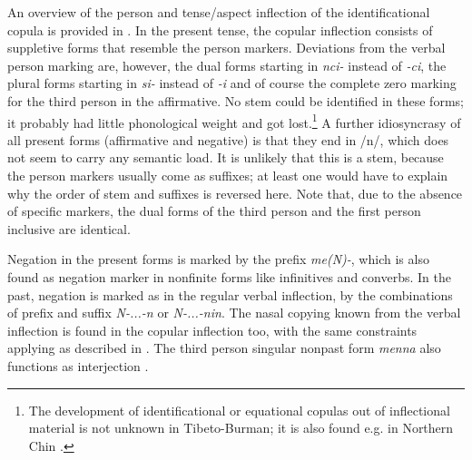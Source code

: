 An overview of the person and tense/aspect inflection of the identificational copula is provided in . In the present tense, the copular inflection consists of suppletive forms that resemble the person markers. Deviations from  the verbal person marking are, however, the dual forms starting in \emph{nci-} instead of \emph{-ci}, the plural forms starting in  \emph{si-} instead of  \emph{-i} and of course the complete zero marking for the third person in the affirmative. No stem could be identified in these forms; it probably had little phonological weight and got lost.\footnote{The development of identificational or equational copulas out of inflectional material is not unknown in Tibeto-Burman; it is also found e.g. in Northern Chin \cite[9]{DeLancey2011_Notes}.}  A further idiosyncrasy of all present forms (affirmative and negative) is that they end in /n/, which does not seem to carry any semantic load. It is unlikely that this is a stem, because the person markers usually come as suffixes; at least one would have to explain why the order of stem and suffixes is reversed here.  Note that, due to the absence of specific markers, the dual forms of the third person and the first person inclusive are identical.

Negation in the present forms is marked by the prefix \emph{me(N)-}, which is also found as negation marker in nonfinite forms like infinitives and converbs. In the past, negation is marked as in the regular verbal inflection, by the combinations of prefix and suffix \emph{N-...-n} or \emph{N-...-nin}. The nasal copying known from the verbal inflection is found in the copular inflection too, with the same constraints applying as described in . The third person singular nonpast form \emph{menna} also functions as interjection . 


